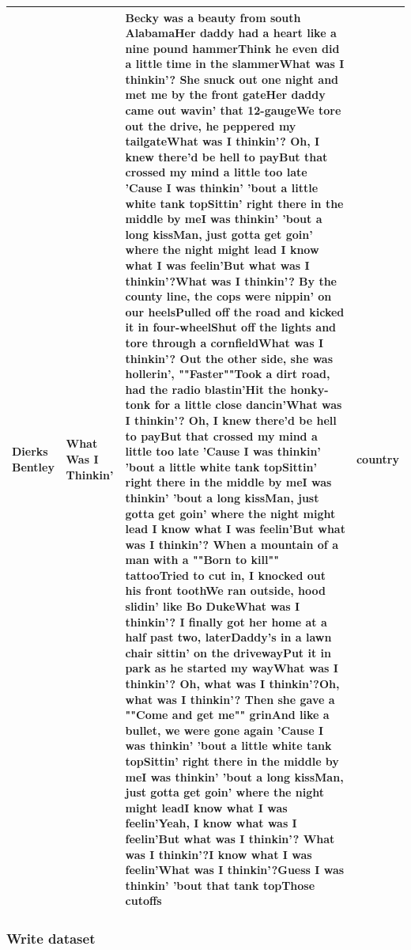 \documentclass[
]{article}
\begin{document}
\begin{table}
\begin{tabular}[t]{llll}
Dierks Bentley & What Was I Thinkin' & Becky was a beauty from south AlabamaHer daddy had a heart like a nine pound hammerThink he even did a little time in the slammerWhat was I thinkin'? She snuck out one night and met me by the front gateHer daddy came out wavin' that 12-gaugeWe tore out the drive, he peppered my tailgateWhat was I thinkin'? Oh, I knew there'd be hell to payBut that crossed my mind a little too late 'Cause I was thinkin' 'bout a little white tank topSittin' right there in the middle by meI was thinkin' 'bout a long kissMan, just gotta get goin' where the night might lead I know what I was feelin'But what was I thinkin'?What was I thinkin'? By the county line, the cops were nippin' on our heelsPulled off the road and kicked it in four-wheelShut off the lights and tore through a cornfieldWhat was I thinkin'? Out the other side, she was hollerin', ""Faster""Took a dirt road, had the radio blastin'Hit the honky-tonk for a little close dancin'What was I thinkin'? Oh, I knew there'd be hell to payBut that crossed my mind a little too late 'Cause I was thinkin' 'bout a little white tank topSittin' right there in the middle by meI was thinkin' 'bout a long kissMan, just gotta get goin' where the night might lead I know what I was feelin'But what was I thinkin'? When a mountain of a man with a ""Born to kill"" tattooTried to cut in, I knocked out his front toothWe ran outside, hood slidin' like Bo DukeWhat was I thinkin'? I finally got her home at a half past two, laterDaddy's in a lawn chair sittin' on the drivewayPut it in park as he started my wayWhat was I thinkin'? Oh, what was I thinkin'?Oh, what was I thinkin'? Then she gave a ""Come and get me"" grinAnd like a bullet, we were gone again 'Cause I was thinkin' 'bout a little white tank topSittin' right there in the middle by meI was thinkin' 'bout a long kissMan, just gotta get goin' where the night might leadI know what I was feelin'Yeah, I know what was I feelin'But what was I thinkin'? What was I thinkin'?I know what I was feelin'What was I thinkin'?Guess I was thinkin' 'bout that tank topThose cutoffs & country\\
\bottomrule
\end{tabular}
\end{table}

\hypertarget{write-dataset-1}{%
\subsubsection{Write dataset}\label{write-dataset-1}}
\end{document}
